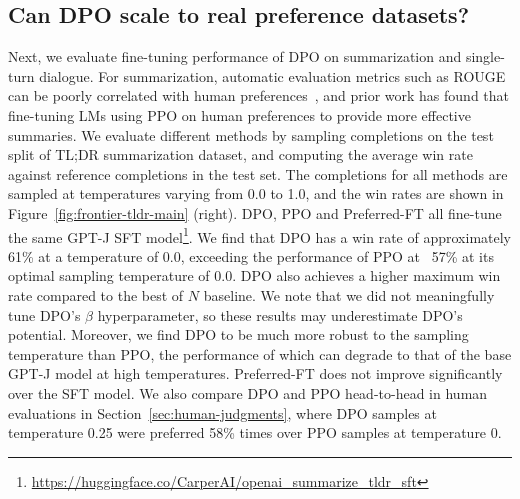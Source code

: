 \documentclass{article}
\begin{document}
\subsection{Can DPO scale to real preference datasets?}
\label{sec:dpo-real-datasets}
Next, we evaluate fine-tuning performance of DPO on summarization and single-turn dialogue. For summarization,
automatic evaluation metrics such as ROUGE can be poorly correlated with human preferences~\citep{stiennon2022learning}, and prior work has found that fine-tuning LMs using PPO on human preferences to provide more effective summaries. We evaluate different methods by sampling completions on the test split of TL;DR summarization dataset, and computing the average win rate against reference completions in the test set. The completions for all methods are sampled at temperatures varying from 0.0 to 1.0, and the win rates are shown in Figure~\ref{fig:frontier-tldr-main} (right). DPO, PPO and Preferred-FT all fine-tune the same GPT-J SFT model\footnote{\url{https://huggingface.co/CarperAI/openai_summarize_tldr_sft}}. We find that DPO has a win rate of approximately 61\% at a temperature of 0.0, exceeding the performance of PPO at ~57\% at its optimal sampling temperature of 0.0. DPO also achieves a higher maximum win rate compared to the best of $N$ baseline. We note that we did not meaningfully tune DPO's $\beta$ hyperparameter, so these results may underestimate DPO's potential. Moreover, we find DPO to be much more robust to the sampling temperature than PPO, the performance of which can degrade to that of the base GPT-J model at high temperatures. Preferred-FT does not improve significantly over the SFT model. We also compare DPO and PPO head-to-head in human evaluations in Section~\ref{sec:human-judgments}, where DPO samples at temperature 0.25 were preferred 58\% times over PPO samples at temperature 0.
\end{document}
